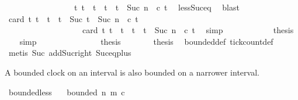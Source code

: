 \begin{isabellebody}
\ \ \ \ \ \ \ \ \ \ \ \ \ \ \ \ {\isacharequal}\ {\isacharbraceleft}t{\isacharprime}{\isachardot}\ t\ {\isasymle}\ t{\isacharprime}\ {\isasymand}\ t{\isacharprime}\ {\isacharless}\ t\ {\isacharplus}\ Suc\ n\ {\isasymand}\ c\ t{\isacharprime}{\isacharbraceright}{\isacartoucheclose}\ \isamarkupfalse%
\ less{\isacharunderscore}Suc{\isacharunderscore}eq\ \isamarkupfalse%
\ blast\isanewline
\ \ \ \ \ \ \ \ \ \ \isamarkupfalse%
\ {\isacartoucheopen}card\ {\isacharbraceleft}t{\isacharprime}{\isachardot}\ t\ {\isasymle}\ t{\isacharprime}\ {\isasymand}\ t{\isacharprime}\ {\isacharless}\ Suc\ {\isacharparenleft}t\ {\isacharplus}\ Suc\ n{\isacharparenright}\ {\isasymand}\ c\ t{\isacharprime}{\isacharbraceright}\isanewline
\ \ \ \ \ \ \ \ \ \ \ \ \ \ \ \ \ \ {\isacharequal}\ {\isacharparenleft}card\ {\isacharbraceleft}t{\isacharprime}{\isachardot}\ t\ {\isasymle}\ t{\isacharprime}\ {\isasymand}\ t{\isacharprime}\ {\isacharless}\ t\ {\isacharplus}\ Suc\ n\ {\isasymand}\ c\ t{\isacharprime}{\isacharbraceright}{\isacharparenright}{\isacartoucheclose}\ \isamarkupfalse%
\ simp\isanewline
\ \ \ \ \ \ \ \ \ \ \isamarkupfalse%
\ {\isacharquery}thesis\ \isamarkupfalse%
\ {\isacharasterisk}{\isacharasterisk}\ \isamarkupfalse%
\ simp\ \isanewline
\ \ \ \ \ \ \isamarkupfalse%
\isanewline
\ \ \ \ \isacommand{{\isacharbraceright}}\isamarkupfalse%
\ \isamarkupfalse%
\ {\isacharquery}thesis\ \isacommand{{\isachardot}{\isachardot}}\isamarkupfalse%
\isanewline
\ \ \isamarkupfalse%
\isanewline
\ \ \isamarkupfalse%
\ {\isacharquery}thesis\ \isamarkupfalse%
\ bounded{\isacharunderscore}def\ tick{\isacharunderscore}count{\isacharunderscore}def\isanewline
\ \ \ \ \isamarkupfalse%
\ {\isacharparenleft}metis\ Suc{\isacharunderscore}{}\ add{\isacharunderscore}Suc{\isacharunderscore}right\ Suc{\isacharunderscore}eq{\isacharunderscore}plus{}{\isacharparenright}\isanewline
{}\isamarkupfalse%
%
\endisatagproof
{\isafoldproof}%
%
\isadelimproof
%
\endisadelimproof
%
\begin{isamarkuptext}%
A bounded clock on an interval is also bounded on a narrower interval.%
\end{isamarkuptext}\isamarkuptrue%
\isamarkupfalse%
\ bounded{\isacharunderscore}less{\isacharcolon}\isanewline
\ \ \ {\isacartoucheopen}bounded\ n{\isacharprime}\ m\ c{\isacartoucheclose}\isanewline

\end{isabellebody}
